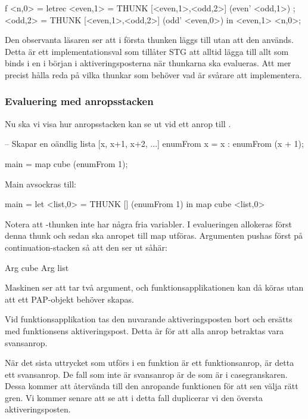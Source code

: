 \documentclass[../Core]{subfiles}
\begin{document}
\begin{codeEx}
f <n,0> = letrec 
    { <even,1> = THUNK [<even,1>,<odd,2>] (even' <odd,1>)
    ; <odd,2>  = THUNK [<even,1>,<odd,2>] (odd' <even,0>)
    } in <even,1> <n,0>;
\end{codeEx}

Den observanta läsaren ser att i första thunken läggs  till utan att den används. 
Detta är ett implementationsval som tillåter STG att alltid lägga till allt som 
binds i en  i början i aktiveringsposterna när thunkarna ska evalueras. 
Att mer precist hålla reda på vilka thunkar som behöver vad är svårare att implementera.




\subsubsection{Evaluering med anropsstacken}



Nu ska vi visa hur anropsstacken kan se ut vid ett anrop till .


\begin{codeEx}
-- Skapar en oändlig lista [x, x+1, x+2, ...]
enumFrom x = x : enumFrom (x + 1);

main = map cube (enumFrom 1);
\end{codeEx}

Main avsockras till:
\begin{codeEx}
main = let <list,0> = THUNK [] (enumFrom 1)
       in  map cube <list,0>
\end{codeEx}



Notera att -thunken inte har några fria variabler.
I evalueringen allokeras först denna thunk och sedan ska anropet till map
utföras. 
Argumenten pushas först på continuation-stacken så att den ser ut såhär:
\begin{codeEx}
Arg cube
Arg list
\end{codeEx}

Maskinen ser att  tar två argument, och funktionsapplikationen 
kan då köras utan att ett PAP-objekt behöver skapas.

Vid funktionsapplikation tas den nuvarande aktiveringsposten bort och ersätts 
med funktionsens aktiveringspost. Detta är för att alla anrop betraktas vara
svansanrop.

När det sista uttrycket som utförs i en funktion är ett funktionsanrop, är
detta ett svansanrop. De fall som inte är svansanrop
är de som är i casegranskaren. Dessa kommer att återvända till den anropande
funktionen för att sen välja rätt gren. Vi kommer senare att se att i detta
fall duplicerar vi den översta aktiveringsposten. 
\end{document}
